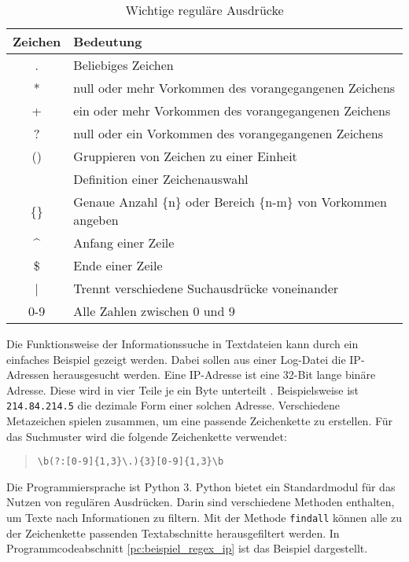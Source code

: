 \begin{table}[H]
	\centering
	\caption{Wichtige reguläre Ausdrücke}
	\begin{tabular}{|c|l|}
		\hline
		\textbf{Zeichen} & \textbf{Bedeutung} \\
		\hline \hline
		. & Beliebiges Zeichen \\
		\hline
		* & null oder mehr Vorkommen des vorangegangenen Zeichens \\
		\hline
		+ & ein oder mehr Vorkommen des vorangegangenen Zeichens \\
		\hline
		? & null oder ein Vorkommen des vorangegangenen Zeichens \\
		\hline
		() & Gruppieren von Zeichen zu einer Einheit \\
		\hline
		[] & Definition einer Zeichenauswahl \\
		\hline
		\{\} & Genaue Anzahl \{n\} oder Bereich \{n-m\} von Vorkommen angeben \\
		\hline
		\^{} & Anfang einer Zeile \\
		\hline
		\$ & Ende einer Zeile \\
		\hline
		| & Trennt verschiedene Suchausdrücke voneinander\\
		\hline
		0-9 & Alle Zahlen zwischen 0 und 9\\
		\hline
	\end{tabular}
	\label{tab:wichtige_regex}
\end{table}
Die Funktionsweise der Informationssuche in Textdateien kann durch ein einfaches Beispiel gezeigt werden.
Dabei sollen aus einer Log-Datei die \acs{IP}-Adressen herausgesucht werden.
Eine \acs{IP}-Adresse ist eine 32-Bit lange binäre Adresse.
Diese wird in vier Teile je ein Byte unterteilt \cite{Metter2012-dz}.
Beispielsweise ist \verb*|214.84.214.5| die dezimale Form einer solchen Adresse.
Verschiedene Metazeichen spielen zusammen, um eine passende Zeichenkette zu erstellen.
Für das Suchmuster wird die folgende Zeichenkette verwendet:
\begin{quote}
	\centering
	\verb*|\b(?:[0-9]{1,3}\.){3}[0-9]{1,3}\b|
\end{quote}
Die Programmiersprache ist Python 3.
Python bietet ein Standardmodul für das Nutzen von regulären Ausdrücken.
Darin sind verschiedene Methoden enthalten, um Texte nach Informationen zu filtern.
Mit der Methode \verb*|findall| können alle zu der Zeichenkette passenden Textabschnitte herausgefiltert werden.
In Programmcodeabschnitt \ref{pc:beispiel_regex_ip} ist das Beispiel dargestellt. \\

